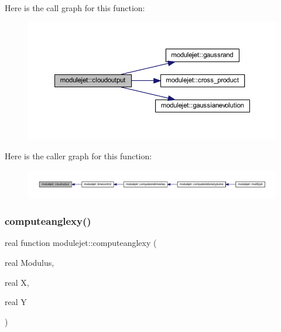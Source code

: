 Here is the call graph for this function\+:\nopagebreak
\begin{figure}[H]
\begin{center}
\leavevmode
\includegraphics[width=350pt]{namespacemodulejet_a61dad6f878bf6cce690b9523901012ac_cgraph}
\end{center}
\end{figure}
Here is the caller graph for this function\+:\nopagebreak
\begin{figure}[H]
\begin{center}
\leavevmode
\includegraphics[width=350pt]{namespacemodulejet_a61dad6f878bf6cce690b9523901012ac_icgraph}
\end{center}
\end{figure}
\mbox{\label{namespacemodulejet_adbbd50d3810071999488736815c23285}} 
\subsubsection{\texorpdfstring{computeanglexy()}{computeanglexy()}}
{\footnotesize\ttfamily real function modulejet\+::computeanglexy (\begin{DoxyParamCaption}\item[{real}]{Modulus,  }\item[{real}]{X,  }\item[{real}]{Y }\end{DoxyParamCaption})\hspace{0.3cm}{\ttfamily [private]}}

